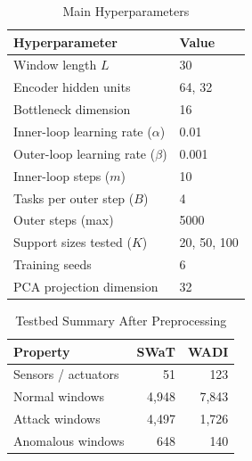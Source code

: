 \documentclass[conference]{IEEEtran}
\begin{document}
\begin{table}[t]
\caption{Main Hyperparameters}
\label{tab:hyper}
\centering
\footnotesize
\begin{tabular}{@{}ll@{}}
\toprule
Hyperparameter & Value \\
\midrule
Window length $L$ & 30 \\
Encoder hidden units & 64, 32 \\
Bottleneck dimension & 16 \\
Inner-loop learning rate ($\alpha$) & 0.01 \\
Outer-loop learning rate ($\beta$) & 0.001 \\
Inner-loop steps ($m$) & 10 \\
Tasks per outer step ($B$) & 4 \\
Outer steps (max) & 5000 \\
Support sizes tested ($K$) & 20, 50, 100 \\
Training seeds & 6 \\
PCA projection dimension & 32 \\
\bottomrule
\end{tabular}
\end{table}

\begin{table}[t]
\caption{Testbed Summary After Preprocessing}
\label{tab:testbeds}
\centering
\footnotesize
\begin{tabular}{@{}lrr@{}}
\toprule
Property & SWaT & WADI \\
\midrule
Sensors / actuators & 51 & 123 \\
Normal windows & 4,948 & 7,843 \\
Attack windows & 4,497 & 1,726 \\
Anomalous windows & 648 & 140 \\
\bottomrule
\end{tabular}
\end{table}
\end{document}
